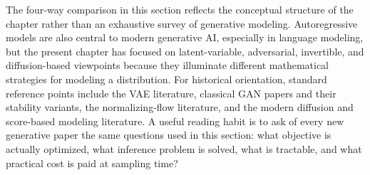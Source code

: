 The four-way comparison in this section reflects the conceptual structure of the chapter rather than an exhaustive survey of generative modeling.
Autoregressive models are also central to modern generative AI, especially in language modeling, but the present chapter has focused on latent-variable, adversarial, invertible, and diffusion-based viewpoints because they illuminate different mathematical strategies for modeling a distribution.
For historical orientation, standard reference points include the VAE literature, classical GAN papers and their stability variants, the normalizing-flow literature, and the modern diffusion and score-based modeling literature.
A useful reading habit is to ask of every new generative paper the same questions used in this section: what objective is actually optimized, what inference problem is solved, what is tractable, and what practical cost is paid at sampling time?
